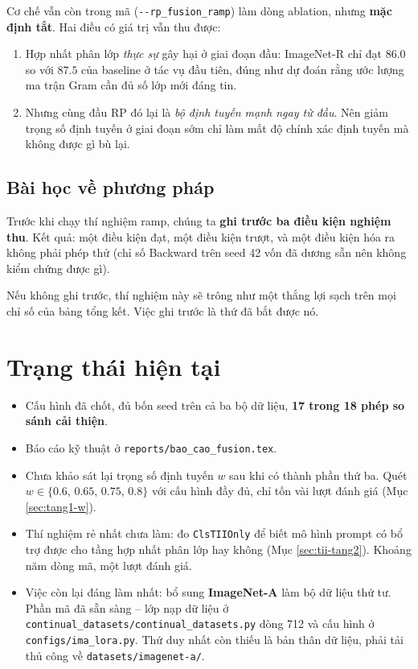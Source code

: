 \documentclass[11pt,a4paper]{article}
\begin{document}
Cơ chế vẫn còn trong mã (\texttt{-{}-rp\_fusion\_ramp}) làm dòng ablation, nhưng
\textbf{mặc định tắt}. Hai điều có giá trị vẫn thu được:

\begin{enumerate}
\item Hợp nhất phân lớp \emph{thực sự} gây hại ở giai đoạn đầu: ImageNet-R chỉ
      đạt $86.0$ so với $87.5$ của baseline ở tác vụ đầu tiên, đúng như dự đoán
      rằng ước lượng ma trận Gram cần đủ số lớp mới đáng tin.
\item Nhưng cùng đầu RP đó lại là \emph{bộ định tuyến mạnh ngay từ đầu}. Nên giảm
      trọng số định tuyến ở giai đoạn sớm chỉ làm mất độ chính xác định tuyến mà
      không được gì bù lại.
\end{enumerate}

\subsection{Bài học về phương pháp}

Trước khi chạy thí nghiệm ramp, chúng ta \textbf{ghi trước ba điều kiện nghiệm
thu}. Kết quả: một điều kiện đạt, một điều kiện trượt, và một điều kiện hóa ra
không phải phép thử (chỉ số Backward trên seed 42 vốn đã dương sẵn nên không kiểm
chứng được gì).

Nếu không ghi trước, thí nghiệm này sẽ trông như một thắng lợi sạch trên mọi chỉ
số của bảng tổng kết. Việc ghi trước là thứ đã bắt được nó.

\section*{Trạng thái hiện tại}

\begin{itemize}
\item Cấu hình đã chốt, đủ bốn seed trên cả ba bộ dữ liệu, \textbf{17 trong 18
      phép so sánh cải thiện}.
\item Báo cáo kỹ thuật ở \texttt{reports/bao\_cao\_fusion.tex}.
\item Chưa khảo sát lại trọng số định tuyến $w$ sau khi có thành phần
      thứ ba. Quét $w \in \{0.6,\, 0.65,\, 0.75,\, 0.8\}$ với cấu hình
      đầy đủ, chỉ tốn vài lượt đánh giá (Mục \ref{sec:tang1-w}).
\item Thí nghiệm rẻ nhất chưa làm: đo \texttt{ClsTIIOnly} để biết mô hình
      prompt có bổ trợ được cho tầng hợp nhất phân lớp hay không (Mục
      \ref{sec:tii-tang2}). Khoảng năm dòng mã, một lượt đánh giá.
\item Việc còn lại đáng làm nhất: bổ sung \textbf{ImageNet-A} làm bộ dữ liệu thứ
      tư. Phần mã đã sẵn sàng -- lớp nạp dữ liệu ở
      \texttt{continual\_datasets/continual\_datasets.py} dòng 712 và cấu hình ở
      \texttt{configs/ima\_lora.py}. Thứ duy nhất còn thiếu là bản thân dữ liệu,
      phải tải thủ công về \texttt{datasets/imagenet-a/}.
\end{itemize}
\end{document}
